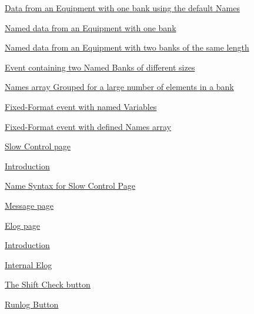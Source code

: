 \begin{TabularC}{2}
\begin{TabularC}{2}
\begin{DoxyItemize}
\begin{DoxyItemize}
\begin{DoxyItemize}
\begin{DoxyItemize}
\begin{DoxyItemize}
\begin{DoxyItemize}
\item \hyperlink{RC_mhttpd_Equipment_page_RC_mhttpd_Equipment_example1}{Data from an Equipment with one bank using the default Names} 
\item \hyperlink{RC_mhttpd_Equipment_page_RC_mhttpd_Equipment_example2}{Named data from an Equipment with one bank} 
\item \hyperlink{RC_mhttpd_Equipment_page_RC_mhttpd_Equipment_example3}{Named data from an Equipment with two banks of the same length} 
\item \hyperlink{RC_mhttpd_Equipment_page_RC_mhttpd_Equipment_example4}{Event containing two Named Banks of different sizes} 
\item \hyperlink{RC_mhttpd_Equipment_page_RC_mhttpd_Equipment_example5}{Names array Grouped for a large number of elements in a bank} 
\item \hyperlink{RC_mhttpd_Equipment_page_RC_mhttpd_Equipment_example6}{Fixed-\/Format event with named Variables} 
\item \hyperlink{RC_mhttpd_Equipment_page_RC_mhttpd_Equipment_example7}{Fixed-\/Format event with defined Names array} 
\end{DoxyItemize}
\end{DoxyItemize}
\end{DoxyItemize}
\item \hyperlink{RC_mhttpd_sc_page}{Slow Control page} 
\begin{DoxyItemize}
\item \hyperlink{RC_mhttpd_sc_page_RC_mhttpd_slow_control_intro}{Introduction} 
\item \hyperlink{RC_mhttpd_sc_page_RC_mhttpd_slow_control_name_syntax}{Name Syntax for Slow Control Page} 
\end{DoxyItemize}
\item \hyperlink{RC_mhttpd_Message_page}{Message page} 
\item \hyperlink{RC_mhttpd_Elog_page}{Elog page} 
\begin{DoxyItemize}
\item \hyperlink{RC_mhttpd_Elog_page_RC_mhttpd_Elog_intro}{Introduction} 
\begin{DoxyItemize}
\item \hyperlink{RC_mhttpd_Elog_page_RC_mhttpd_Internal_Elog}{Internal Elog} 
\begin{DoxyItemize}
\item \hyperlink{RC_mhttpd_Elog_page_RC_mhttpd_Internal_Elog_shift_check}{The Shift Check button} 
\item \hyperlink{RC_mhttpd_Elog_page_RC_mhttpd_Internal_Elog_runlog}{Runlog Button} 

\end{DoxyItemize}
\end{DoxyItemize}
\end{DoxyItemize}
\end{DoxyItemize}
\end{DoxyItemize}
\end{DoxyItemize}
\end{TabularC}
\end{TabularC}
